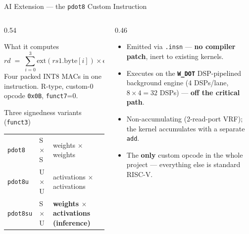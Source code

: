 \documentclass[aspectratio=169,11pt]{beamer}
\newcommand{\hl}[1]{{\color{simtixaccent}\textbf{#1}}}
\newcommand{\navy}[1]{{\color{simtixblue}\textbf{#1}}}
\begin{document}
\begin{frame}{AI Extension --- the \texttt{pdot8} Custom Instruction}
  \begin{columns}[T]
    \begin{column}{0.54\textwidth}
      \begin{block}{What it computes}
        \small
        \[ rd \;=\; \sum_{i=0}^{3} \text{ext}(rs1.\text{byte}[i]) \times \text{ext}(rs2.\text{byte}[i]) \]
        Four packed INT8 MACs in one instruction. R-type, custom-0 opcode \texttt{0x0B}, \texttt{funct7}=0.
      \end{block}
      \begin{block}{Three signedness variants (\texttt{funct3})}
        \small
        \begin{tabular}{@{}lll@{}}
          \texttt{pdot8}   & S$\times$S & weights $\times$ weights \\
          \texttt{pdot8u}  & U$\times$U & activations $\times$ activations \\
          \texttt{pdot8su} & S$\times$U & \hl{weights $\times$ activations (inference)} \\
        \end{tabular}
      \end{block}
    \end{column}
    \begin{column}{0.46\textwidth}
      \begin{itemize}
        \item Emitted via \texttt{.insn} --- \hl{no compiler patch}, inert to existing kernels.
        \item Executes on the \navy{\texttt{W\_DOT}} DSP-pipelined background engine (4 DSPs/lane,
          $8\times4=32$ DSPs) --- \hl{off the critical path}.
        \item Non-accumulating (2-read-port VRF); the kernel accumulates with a separate \texttt{add}.
        \item The \hl{only} custom opcode in the whole project --- everything else is standard
          RISC-V.
      \end{itemize}
    \end{column}
  \end{columns}
\end{frame}
\end{document}
